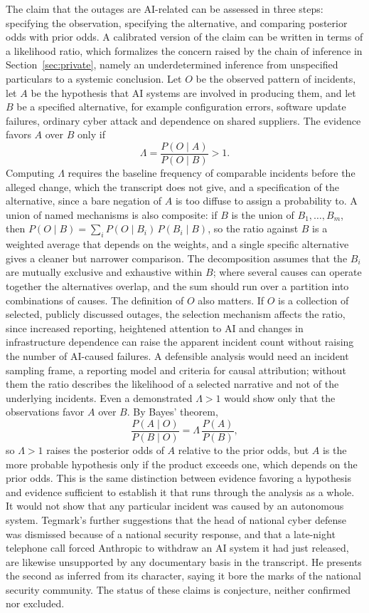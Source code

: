 \documentclass[11pt]{article}
\begin{document}
The claim that the outages are AI-related can be assessed in three steps: specifying the observation, specifying the alternative, and comparing posterior odds with prior odds. A calibrated version of the claim can be written in terms of a likelihood ratio, which formalizes the concern raised by the chain of inference in Section~\ref{sec:private}, namely an underdetermined inference from unspecified particulars to a systemic conclusion. Let $O$ be the observed pattern of incidents, let $A$ be the hypothesis that AI systems are involved in producing them, and let $B$ be a specified alternative, for example configuration errors, software update failures, ordinary cyber attack and dependence on shared suppliers. The evidence favors $A$ over $B$ only if
\[
\Lambda=\frac{P(O\mid A)}{P(O\mid B)}>1 .
\]
Computing $\Lambda$ requires the baseline frequency of comparable incidents before the alleged change, which the transcript does not give, and a specification of the alternative, since a bare negation of $A$ is too diffuse to assign a probability to. A union of named mechanisms is also composite: if $B$ is the union of $B_1,\dots,B_m$, then $P(O\mid B)=\sum_i P(O\mid B_i)\,P(B_i\mid B)$, so the ratio against $B$ is a weighted average that depends on the weights, and a single specific alternative gives a cleaner but narrower comparison. The decomposition assumes that the $B_i$ are mutually exclusive and exhaustive within $B$; where several causes can operate together the alternatives overlap, and the sum should run over a partition into combinations of causes. The definition of $O$ also matters. If $O$ is a collection of selected, publicly discussed outages, the selection mechanism affects the ratio, since increased reporting, heightened attention to AI and changes in infrastructure dependence can raise the apparent incident count without raising the number of AI-caused failures. A defensible analysis would need an incident sampling frame, a reporting model and criteria for causal attribution; without them the ratio describes the likelihood of a selected narrative and not of the underlying incidents. Even a demonstrated $\Lambda>1$ would show only that the observations favor $A$ over $B$. By Bayes' theorem,
\[
\frac{P(A\mid O)}{P(B\mid O)}=\Lambda\,\frac{P(A)}{P(B)},
\]
so $\Lambda>1$ raises the posterior odds of $A$ relative to the prior odds, but $A$ is the more probable hypothesis only if the product exceeds one, which depends on the prior odds. This is the same distinction between evidence favoring a hypothesis and evidence sufficient to establish it that runs through the analysis as a whole. It would not show that any particular incident was caused by an autonomous system. Tegmark's further suggestions that the head of national cyber defense was dismissed because of a national security response, and that a late-night telephone call forced Anthropic to withdraw an AI system it had just released, are likewise unsupported by any documentary basis in the transcript. He presents the second as inferred from its character, saying it bore the marks of the national security community. The status of these claims is conjecture, neither confirmed nor excluded.
\end{document}
